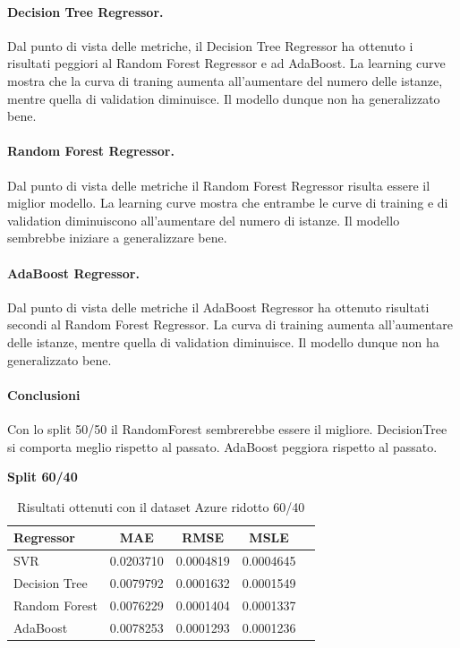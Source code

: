 \paragraph{\textbf{Decision Tree Regressor}.}
Dal punto di vista delle metriche, il Decision Tree Regressor ha ottenuto i risultati peggiori al Random Forest Regressor e ad AdaBoost.
La learning curve mostra che la curva di traning aumenta all'aumentare del numero delle istanze, mentre quella di validation diminuisce. Il modello dunque non ha generalizzato bene.
\paragraph{\textbf{Random Forest Regressor}.}
Dal punto di vista delle metriche il Random Forest Regressor risulta essere il miglior modello.
La learning curve mostra che entrambe le curve di training e di validation diminuiscono all'aumentare del numero di istanze. Il modello sembrebbe iniziare a generalizzare bene.
\paragraph{\textbf{AdaBoost Regressor}.}
Dal punto di vista delle metriche il AdaBoost Regressor ha ottenuto risultati secondi al Random Forest Regressor. La curva di training aumenta all'aumentare delle istanze, mentre quella di validation diminuisce. Il modello dunque non ha generalizzato bene.

\paragraph{\textbf{Conclusioni}} Con lo split 50/50 il RandomForest sembrerebbe essere il migliore. DecisionTree si comporta meglio rispetto al passato. AdaBoost peggiora rispetto al passato.


\noindent\textbf{Split 60/40}


\begin{table}[H]
    \centering
    \begin{tabular}{|>{\centering\arraybackslash}m{5cm}|c|c|c|c|}
        \hline
        \textbf{Regressor} & \textbf{MAE} & \textbf{RMSE} & \textbf{MSLE} \\ [10pt]
        \hline
        SVR & 0.0203710 & 0.0004819 & 0.0004645 \\ [10pt]
        \hline
        Decision Tree & 0.0079792 & 0.0001632 & 0.0001549 \\ [10pt]
        \hline
        Random Forest & 0.0076229 & 0.0001404 & 0.0001337 \\ [10pt]
        \hline
        AdaBoost & 0.0078253 & 0.0001293 & 0.0001236 \\ [10pt]
        \hline
    \end{tabular}
    \caption{Risultati ottenuti con il dataset Azure ridotto 60/40}
    \label{tab:results}
\end{table}

